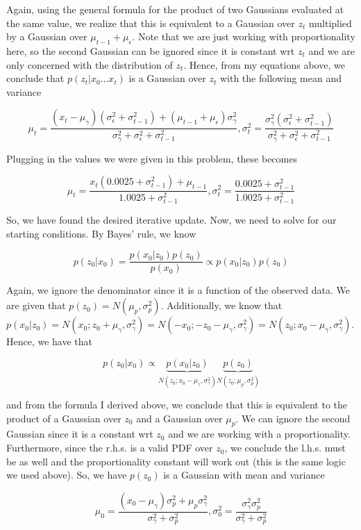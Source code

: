 \documentclass[submit]{harvardml}
\begin{document}
\begin{enumerate}
Again, using the general formula for the product of two Gaussians evaluated at the same value, we realize that this is equivalent to a Gaussian over $z_t$ multiplied by a Gaussian over $\mu_{t-1} + \mu_{\epsilon}$. Note that we are just working with proportionality here, so the second Gaussian can be ignored since it is constant wrt $z_t$ and we are only concerned with the distribution of $z_t$. Hence, from my equations above, we conclude that $p(z_t|x_0\dots x_t)$ is a Gaussian over $z_t$ with the following mean and variance

$$ \boxed{\mu_t = \frac{(x_t-\mu_\gamma)(\sigma^2_\epsilon + \sigma^2_{t-1}) + (\mu_{t-1} + \mu_\epsilon)\sigma^2_\gamma}{\sigma^2_\gamma + \sigma^2_\epsilon + \sigma^2_{t-1}}, \sigma^2_t = \frac{\sigma^2_\gamma(\sigma^2_\epsilon + \sigma^2_{t-1})}{\sigma^2_\gamma+\sigma^2_\epsilon + \sigma^2_{t-1}}}$$

Plugging in the values we were given in this problem, these becomes

$$ \boxed{\mu_t = \frac{x_t(0.0025 + \sigma^2_{t-1}) + \mu_{t-1}}{1.0025 + \sigma^2_{t-1}}, \sigma^2_t = \frac{0.0025 + \sigma^2_{t-1}}{1.0025 + \sigma^2_{t-1}}}$$

So, we have found the desired iterative update. Now, we need to solve for our starting conditions. By Bayes' rule, we know

$$p(z_0|x_0) =\frac{p(x_0|z_0)p(z_0)}{p(x_0)} \propto p(x_0|z_0)p(z_0)$$

Again, we ignore the denominator since it is a function of the observed data. We are given that $p(z_0) = N(\mu_p,\sigma^2_p)$. Additionally, we know that $p(x_0|z_0) = N(x_0; z_0  + \mu_\gamma, \sigma^2_\gamma) =  N(-x_0; -z_0  - \mu_\gamma, \sigma^2_\gamma) = N(z_0; x_0  - \mu_\gamma, \sigma^2_\gamma) $. Hence, we have that 

$$p(z_0|x_0)  \propto \underbrace{p(x_0|z_0)}_{N(z_0; x_0  - \mu_\gamma, \sigma^2_\gamma)} \underbrace{p(z_0)}_{N(z_0;\mu_p,\sigma^2_p)}$$

and from the formula I derived above, we conclude that this is equivalent to the product of a Gaussian over $z_0$ and a Gaussian over $\mu_p$. We can ignore the second Gaussian since it is a constant wrt $z_0$ and we are working with a proportionality. Furthermore, since the r.h.s. is a valid PDF over $z_0$, we conclude the l.h.s. must be as well and the proportionality constant will work out (this is the same logic we used above). So, we have $p(z_0)$ is a Gaussian with mean and variance

$$\boxed{\mu_0 = \frac{(x_0-\mu_\gamma)\sigma^2_p + \mu_p\sigma^2_\gamma}{\sigma^2_\gamma + \sigma^2_p }, \sigma^2_0 =  \frac{\sigma^2_\gamma\sigma^2_p}{\sigma^2_\gamma + \sigma^2_p}}$$


\end{enumerate}
\end{document}
